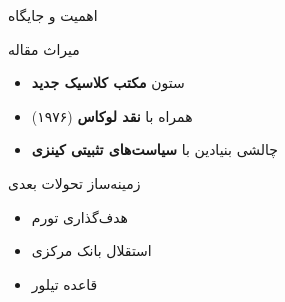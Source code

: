 \documentclass[aspectratio=169,11pt]{beamer}
\newcommand{\highlight}[1]{\textcolor{AccentOrange}{\textbf{#1}}}
\newcommand{\important}[1]{\textcolor{AlertRed}{\textbf{#1}}}
\newcommand{\keyword}[1]{\textcolor{MainBlue}{\textbf{#1}}}
\begin{document}
\begin{frame}{اهمیت و جایگاه}
  \begin{block}{میراث مقاله}
    \begin{itemize}
      \item ستون \keyword{مکتب کلاسیک جدید}
      \item همراه با \highlight{نقد لوکاس} (۱۹۷۶)
      \item چالشی بنیادین با \important{سیاست‌های تثبیتی کینزی}
    \end{itemize}
  \end{block}
  \vspace{0.3cm}
  \begin{exampleblock}{زمینه‌ساز تحولات بعدی}
    \begin{itemize}
      \item هدف‌گذاری تورم
      \item استقلال بانک مرکزی
      \item قاعده تیلور
    \end{itemize}
  \end{exampleblock}
\end{frame}
\end{document}
